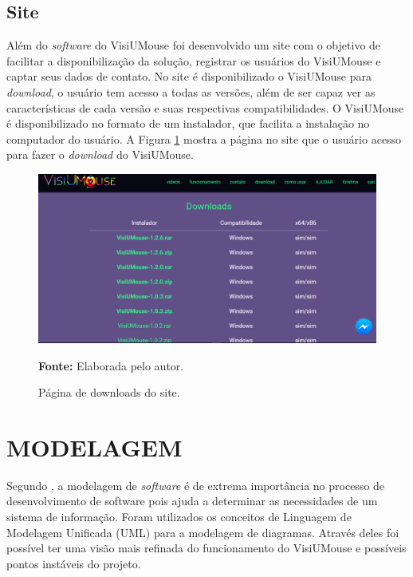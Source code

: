 \section{Site}\label{sub:visiumouse-objtivo-site}
Além do \textit{software} do VisiUMouse foi desenvolvido um site com o objetivo de facilitar a disponibilização da solução, registrar os usuários do VisiUMouse e captar seus dados de contato. 
No site é disponibilizado o VisiUMouse para \textit{download}, o usuário tem acesso a todas as versões, além de ser capaz ver as características de cada versão e suas respectivas compatibilidades. O VisiUMouse é disponibilizado no formato de um instalador, que facilita a instalação no computador do usuário. A Figura \ref{fig:site-download} mostra a página no site que o usuário acesso para fazer o \textit{download} do VisiUMouse.


\begin{figure}[H]
\caption{Página de downloads do site.} 
\centering \includegraphics[scale=0.35]{img/site-download.png}

{\fontsize{11}{11}\selectfont \textbf{Fonte:} Elaborada pelo autor.}
\label{fig:site-download}
\end{figure}


\chapter{MODELAGEM}\label{CAP5}

Segundo , a modelagem de \textit{software} é de extrema importância no processo de desenvolvimento de software pois ajuda a determinar as necessidades de um sistema de informação. Foram utilizados os conceitos de Linguagem de Modelagem Unificada (UML) 
para a modelagem de diagramas. Através deles foi possível ter uma visão mais refinada do funcionamento do VisiUMouse e possíveis pontos instáveis do projeto.

